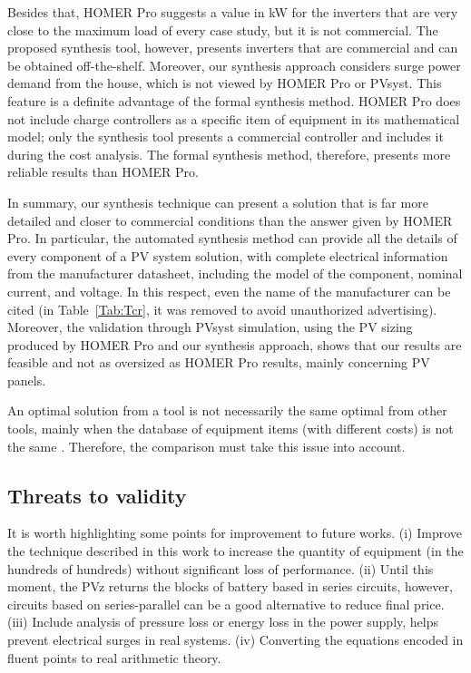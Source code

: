 \documentclass[10pt,journal,compsoc]{IEEEtran}
\begin{document}
Besides that, HOMER Pro suggests a value in kW for the inverters that are very close to the maximum load of every case study, but it is not commercial. The proposed synthesis tool, however, presents inverters that are commercial and can be obtained off-the-shelf. Moreover, our synthesis approach considers surge power demand from the house, which is not viewed by HOMER Pro or PVsyst. This feature is a definite advantage of the formal synthesis method. HOMER Pro does not include charge controllers as a specific item of equipment in its mathematical model; only the synthesis tool presents a commercial controller and includes it during the cost analysis. The formal synthesis method, therefore, presents more reliable results than HOMER Pro.

In summary, our synthesis technique can present a solution that is far more detailed and closer to commercial conditions than the answer given by HOMER Pro. In particular, the automated synthesis method can provide all the details of every component of a PV system solution, with complete electrical information from the manufacturer datasheet, including the model of the component, nominal current, and voltage. In this respect, even the name of the manufacturer can be cited (in Table~\ref{Tab:Tcr}, it was removed to avoid unauthorized advertising). Moreover, the validation through PVsyst simulation, using the PV sizing produced by HOMER Pro and our synthesis approach, shows that our results are feasible and not as oversized as HOMER Pro results, mainly concerning PV panels.

An optimal solution from a tool is not necessarily the same optimal from other tools, mainly when the database of equipment items (with different costs) is not the same \cite{Alsadi2018}. Therefore, the comparison must take this issue into account. 

\subsection{Threats to validity} 

\color{blue}It is worth highlighting some points for improvement to future works. (i) Improve the technique described in this work to increase the quantity of equipment (in the hundreds of hundreds) without significant loss of performance. (ii) Until this moment, the PVz returns the blocks of battery based in series circuits, however, circuits based on series-parallel can be a good alternative to reduce final price. (iii) Include analysis of pressure loss or energy loss in the power supply, helps prevent electrical surges in real systems. (iv) Converting the equations encoded in fluent points to real arithmetic theory.
\end{document}
